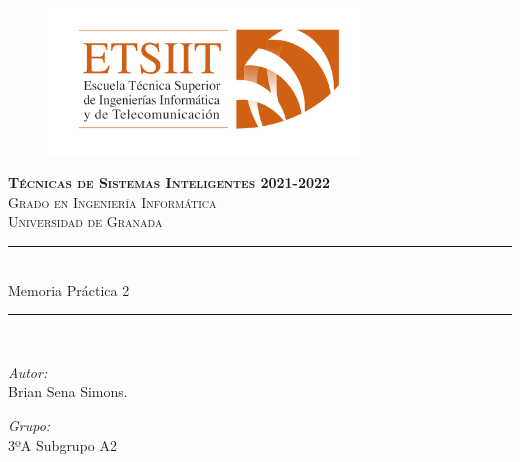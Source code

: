 \documentclass[12pt,letterpaper]{article}
\author{Brian Sena Simons} %
\date{\normalsize\today} %
\numberwithin{equation}{section} %
\numberwithin{figure}{section} %
\numberwithin{table}{section} %
\newcommand{\horrule}[1]{\rule{\linewidth}{#1}} %
\begin{document}
\begin{titlepage}
\begin{figure}[H]
    \vspace{-1.3cm}
    \begin{center}
        \includegraphics[width=0.75\textwidth]{Etsiit}
    \end{center}
\end{figure}
\vspace{1.3cm}
\centering
\normalfont \normalsize
    \textsc{\textbf{Técnicas de Sistemas Inteligentes 2021-2022} \\ Grado en Ingeniería Informática \\ Universidad de Granada} \\ [25pt] %
    \horrule{0.5pt} \\[0.4cm] %
    \huge Memoria Práctica 2 \\ %
    \horrule{2pt} \\[0.5cm] %

\begin{minipage}{0.4\textwidth}
    \begin{flushleft}\large
        \emph{Autor:} \\
        \vspace{.15cm}
        Brian Sena Simons.
    \end{flushleft}
\end{minipage}
\begin{minipage}{0.4\textwidth}
     \begin{flushright}\large
         \emph{Grupo: } \\
         3ºA Subgrupo A2
    \end{flushright}
\end{minipage}
\end{titlepage}

\doublespacing
\hypertarget{Indice}{}
\tableofcontents
\newpage
\end{document}
